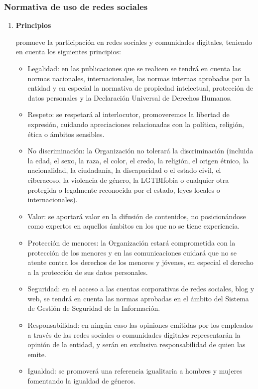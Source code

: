 
\subsubsection{Normativa de uso de redes sociales}

\begin{enumerate}[label=\alph*)]

\item \textbf{Principios}

\Beneficiario{} promueve la participación en redes sociales y comunidades digitales, teniendo en cuenta los siguientes principios:
\begin{itemize}
    \item Legalidad: en las publicaciones que se realicen se tendrá en cuenta las normas nacionales, internacionales, las normas internas aprobadas por la entidad y en especial la normativa de propiedad intelectual, protección de datos personales y la Declaración Universal de Derechos Humanos.
    \item Respeto: se respetará al interlocutor, promoveremos la libertad de expresión, cuidando apreciaciones relacionadas con la política, religión, ética o ámbitos sensibles.
    \item No discriminación: la Organización no tolerará la discriminación (incluida la edad, el sexo, la raza, el color, el credo, la religión, el origen étnico, la nacionalidad, la ciudadanía, la discapacidad o el estado civil, el ciberacoso, la violencia de género, la LGTBIfobia o cualquier otra protegida o legalmente reconocida por el estado, leyes locales o internacionales).
    \item Valor: se aportará valor en la difusión de contenidos, no posicionándose como expertos en aquellos ámbitos en los que no se tiene experiencia.
    \item Protección de menores: la Organización estará comprometida con la protección de los menores y en las comunicaciones cuidará que no se atente contra los derechos de los menores y jóvenes, en especial el derecho a la protección de sus datos personales.
    \item Seguridad: en el acceso a las cuentas corporativas de redes sociales, blog y web, se tendrá en cuenta las normas aprobadas en el ámbito del Sistema de Gestión de Seguridad de la Información.
    \item Responsabilidad: en ningún caso las opiniones emitidas por los empleados a través de las redes sociales o comunidades digitales representarán la opinión de la entidad, y serán en exclusiva responsabilidad de quien las emite.
    \item Igualdad: se promoverá una referencia igualitaria a hombres y mujeres fomentando la igualdad de géneros.
\end{itemize}


\end{enumerate}
